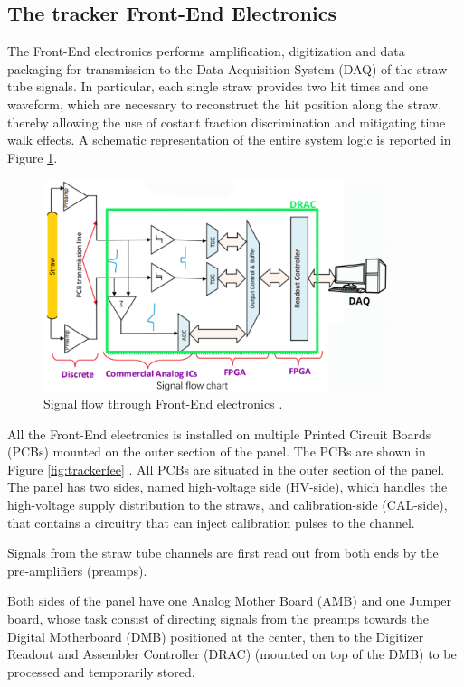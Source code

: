 \subsection{The tracker Front-End Electronics}\label{tfee}
The Front-End electronics performs amplification, digitization and data packaging 
for transmission to the Data Acquisition System (DAQ) of the straw-tube signals. 
In particular, each single straw provides two hit times and one waveform, 
which are necessary to reconstruct the hit position along the straw, 
thereby allowing the use of costant fraction discrimination and mitigating time walk effects. 
A schematic representation of the entire system logic is reported in Figure \ref{fig:flowfee}.
\begin{figure}[!h]
    \centering
    \includegraphics[width =0.9\textwidth]{figures/png/Screenshot_20240529_133230.png}
    \caption[Signal flow through Front-End electronics.]{Signal flow through Front-End electronics \cite{bartoszek2015mu2e}.}
    \label{fig:flowfee}
    \end{figure}
All the Front-End electronics is installed on multiple Printed Circuit Boards 
(PCBs) mounted on the outer section of the panel. 
The PCBs are shown in Figure \ref{fig:trackerfee} \cite{vadimmu2e}.
All PCBs are situated in the outer section of the panel. 
The panel has two sides, named high-voltage side (HV-side), 
which handles the high-voltage supply distribution to the straws, and 
calibration-side (CAL-side), that contains a circuitry that can inject calibration
pulses to the channel.

Signals from the straw tube channels are first read 
out from both ends by the pre-amplifiers (preamps).

Both sides of the panel have one Analog Mother Board (AMB) and one Jumper board, 
whose task consist of directing signals from the preamps towards the Digital 
Motherboard (DMB) positioned at the center, then to the Digitizer Readout and 
Assembler Controller (DRAC) (mounted on top of the DMB) to be processed and 
temporarily stored. 

